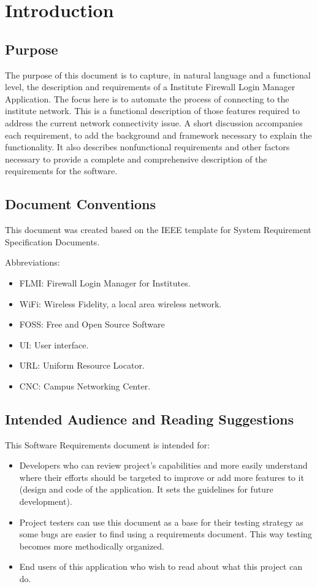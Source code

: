 \chapter{Introduction}
\label{ch:intro}
\section{Purpose}
The purpose of this document is to capture, in natural language and a functional level, the description and requirements of a Institute Firewall Login Manager Application. The focus here is to automate the process of connecting to the institute network. This is a functional description of those features required to address the current network connectivity issue. A short discussion accompanies each requirement, to add the background and framework necessary to explain the functionality. It also describes nonfunctional requirements and other factors necessary to provide a complete and comprehensive description of the requirements for the software. 
\section{Document Conventions}
This document was created based on the IEEE template for System Requirement Specification Documents.

Abbreviations:
\begin{itemize}
    \item FLMI: Firewall Login Manager for Institutes.
    \item WiFi: Wireless Fidelity, a local area wireless network. 
    \item FOSS: Free and Open Source Software
    \item UI: User interface.
    \item URL: Uniform Resource Locator.
    \item CNC: Campus Networking Center.
\end{itemize}


\section{Intended Audience and Reading Suggestions}
This Software Requirements document is intended for:
\begin{itemize}
    \item Developers who can review project’s capabilities and more  easily  understand  where  their efforts  should  be targeted to improve or add more features to it (design and code of the application. It  sets  the  guidelines  for  future development).
    \item Project testers can use this document as a base for their testing  strategy  as  some  bugs  are easier  to  find  using  a requirements  document.  This  way  testing  becomes  more methodically organized.
    \item End  users  of  this  application  who  wish  to  read  about what this project can do.
\end{itemize}
